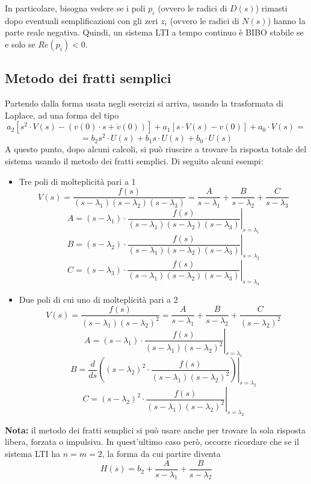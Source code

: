 \documentclass[a4paper,oneside,titlepage]{book}
\begin{document}
In particolare, bisogna vedere se i poli $p_i$ (ovvero le radici di $D(s)$) rimasti dopo eventuali semplificazioni con gli zeri $z_i$ (ovvero le radici di $N(s)$) hanno la parte reale negativa. Quindi, un sistema LTI a tempo continuo è BIBO stabile se e solo se $Re(p_i)<0$.

\subsection{Metodo dei fratti semplici}
Partendo dalla forma usata negli esercizi si arriva, usando la trasformata di Laplace, ad una forma del tipo
\[ a_2 [s^2 \cdot V(s) - (v(0) \cdot s + \dot{v}(0))] + a_1 [s \cdot V(s) - v(0)] + a_0 \cdot V(s) = \]
\[ = b_2 s^2 \cdot U(s) + b_1 s \cdot U(s) + b_0 \cdot U(s) \]
A questo punto, dopo alcuni calcoli, si può riuscire a trovare la risposta totale del sistema usando il metodo dei fratti semplici. Di seguito alcuni esempi:
\begin{itemize}
\item Tre poli di molteplicità pari a 1
\[ V(s) = \frac{f(s)}{(s-\lambda_1)(s-\lambda_2)(s-\lambda_3)} = \frac{A}{s-\lambda_1} + \frac{B}{s-\lambda_2} + \frac{C}{s-\lambda_3} \]
\[ A = \left. (s-\lambda_1) \cdot \frac{f(s)}{(s-\lambda_1)(s-\lambda_2)(s-\lambda_3)} \right|_{s=\lambda_1} \]
\[ B = \left. (s-\lambda_2) \cdot \frac{f(s)}{(s-\lambda_1)(s-\lambda_2)(s-\lambda_3)} \right|_{s=\lambda_2} \]
\[ C = \left. (s-\lambda_3) \cdot \frac{f(s)}{(s-\lambda_1)(s-\lambda_2)(s-\lambda_3)} \right|_{s=\lambda_3} \]

\item Due poli di cui uno di molteplicità pari a 2
\[ V(s) = \frac{f(s)}{(s-\lambda_1)(s-\lambda_2)^2} = \frac{A}{s-\lambda_1} + \frac{B}{s-\lambda_2} + \frac{C}{(s-\lambda_2)^2} \]
\[ A = \left. (s-\lambda_1) \cdot \frac{f(s)}{(s-\lambda_1)(s-\lambda_2)^2} \right|_{s=\lambda_1} \]
\[ B = \frac{d}{ds} \left. \left( (s-\lambda_2)^2 \cdot \frac{f(s)}{(s-\lambda_1)(s-\lambda_2)^2} \right) \right|_{s=\lambda_2} \]
\[ C = \left. (s-\lambda_2)^2 \cdot \frac{f(s)}{(s-\lambda_1)(s-\lambda_2)^2} \right|_{s=\lambda_2} \]
\end{itemize}
\textbf{Nota:}
il metodo dei fratti semplici si può usare anche per trovare la sola risposta libera, forzata o impulsiva. In quest'ultimo caso però, occorre ricordare che se il sistema LTI ha $n=m=2$, la forma da cui partire diventa
\[ H(s) = b_2 + \frac{A}{s-\lambda_1} + \frac{B}{s-\lambda_2} \]
\end{document}
